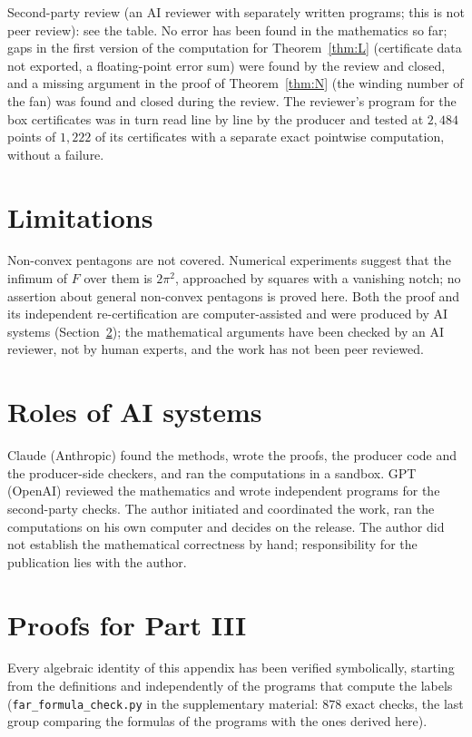 \documentclass[11pt]{article}
\theoremstyle{remark}
\begin{document}
Second-party review (an AI reviewer with separately written programs; this is not peer review): see the table. No
error has been found in the mathematics so far; gaps in the first version of the computation for
Theorem~\ref{thm:L} (certificate data not exported, a floating-point error sum) were found by the review and closed, and a missing argument in the
proof of Theorem~\ref{thm:N} (the winding number of the fan) was found and closed during the review. The reviewer's
program for the box certificates was in turn read line by line by the producer and tested at $2{,}484$ points of
$1{,}222$ of its certificates with a separate exact pointwise computation, without a failure.

\section{Limitations}
Non-convex pentagons are not covered. Numerical experiments suggest that the infimum of $F$ over them is $2\pi^2$,
approached by squares with a vanishing notch; no assertion about general non-convex pentagons is proved here. Both the proof and its independent re-certification
are computer-assisted and were produced by AI systems (Section~\ref{sec:ai}); the mathematical arguments have been
checked by an AI reviewer, not by human experts, and the work has not been peer reviewed.

\section{Roles of AI systems}\label{sec:ai}
Claude (Anthropic) found the methods, wrote the proofs, the producer code and the producer-side checkers, and ran the
computations in a sandbox. GPT (OpenAI) reviewed the mathematics and wrote independent programs for the second-party
checks. The author initiated and coordinated the work, ran the computations on his own computer and decides on the
release. The author did not establish the mathematical correctness by hand; responsibility for the publication lies
with the author.

\appendix
\section{Proofs for Part III}\label{app:far}
Every algebraic identity of this appendix has been verified symbolically, starting from the definitions and
independently of the programs that compute the labels (\texttt{far\_formula\_check.py} in the supplementary material:
$878$ exact checks, the last group comparing the formulas of the programs with the ones derived here).
\end{document}
